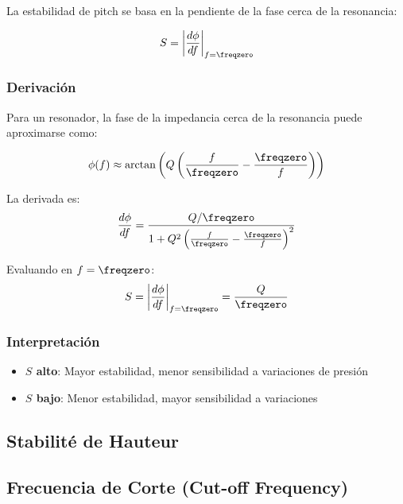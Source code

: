 La estabilidad de pitch se basa en la pendiente de la fase cerca de la resonancia:

\begin{equation}
S = \left|\frac{d\phi}{df}\right|_{f=\freqzero}
\label{eq:pitch_stability}
\end{equation}

\subsubsection{Derivación}

Para un resonador, la fase de la impedancia cerca de la resonancia puede aproximarse como:

\begin{equation}
\phi(f) \approx \arctan\left(Q\left(\frac{f}{\freqzero} - \frac{\freqzero}{f}\right)\right)
\end{equation}

La derivada es:
\begin{equation}
\frac{d\phi}{df} = \frac{Q/\freqzero}{1 + Q^2\left(\frac{f}{\freqzero} - \frac{\freqzero}{f}\right)^2}
\end{equation}

Evaluando en $f = \freqzero$:
\begin{equation}
S = \left|\frac{d\phi}{df}\right|_{f=\freqzero} = \frac{Q}{\freqzero}
\end{equation}

\subsubsection{Interpretación}

\begin{itemize}
    \item \textbf{$S$ alto}: Mayor estabilidad, menor sensibilidad a variaciones de presión
    \item \textbf{$S$ bajo}: Menor estabilidad, mayor sensibilidad a variaciones
\end{itemize}

\subsection{Stabilité de Hauteur}


\subsection{Frecuencia de Corte (Cut-off Frequency)}

